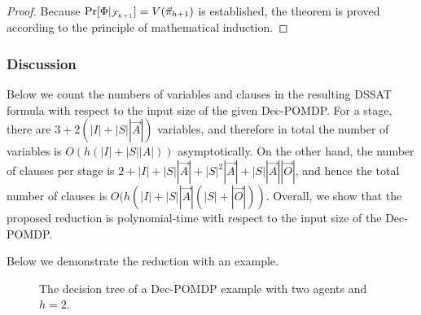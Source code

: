 \begin{proof}
    Because $\Pr[\Phi|_{\mathcal{F}_{h+1}}]=V(\vec{\pi}_{h+1})$ is established,
    the theorem is proved according to the principle of mathematical induction.
\end{proof}

\subsubsection{Discussion}
Below we count the numbers of variables and clauses in the resulting DSSAT formula with respect to the input size of the given Dec-POMDP.
For a stage,
there are $3+2(|I|+|S||\vec{A}|)$ variables,
and therefore in total the number of variables is $O(h(|I|+|S||A|))$ asymptotically.
On the other hand,
the number of clauses per stage is $2+|I|+|S||\vec{A}|+|S|^2|\vec{A}|+|S||\vec{A}||\vec{O}|$,
and hence the total number of clauses is $O(h(|I|+|S||\vec{A}|(|S|+|\vec{O}|))$.
Overall, we show that the proposed reduction is polynomial-time with respect to the input size of the Dec-POMDP.

Below we demonstrate the reduction with an example.

\begin{figure}[t]
    \centering
    
    \caption{The decision tree of a Dec-POMDP example with two agents and $h=2$.}
    \label{fig:dssat-dec-pomdp-example}
\end{figure}

